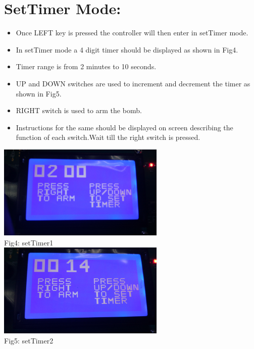 \documentclass{article}
\begin{document}
\section{SetTimer Mode:}
\begin{itemize}
    \item Once LEFT key is pressed the controller will then enter in setTimer mode.
    \item In setTimer mode a 4 digit timer should be displayed as shown in Fig4. 
    \item Timer range is from 2 minutes to 10 seconds.
    \item UP and DOWN switches are used to increment and decrement the timer as shown in Fig5.
    \item RIGHT switch is used to arm the bomb.
    \item Instructions for the same should be displayed on screen describing the function of each switch.Wait till the right switch is pressed.
\end{itemize}
\begin{center}
   \includegraphics[width=8cm]{setTimer1}
   \\Fig4: setTimer1
   \\[2\baselineskip]
   \includegraphics[width=8cm]{setTimer2}
   \\Fig5: setTimer2
   \\[2\baselineskip]
 \end{center}
\end{document}
